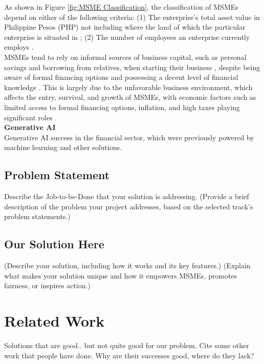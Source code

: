 \documentclass{article}
\begin{document}
As shown in Figure \ref{fig:MSME Classification}, the classification of MSMEs depend on either of the following criteria: (1) The enterprise's total asset value in Philippine Pesos (PHP)  not including where the land of which the particular enterprise is situated in \parencite{republic_of_the_philippines_magna_2008}; (2) The number of employees an enterprise currently employs \parencite{senate_economic_planning_office_msme_2012}.\\

MSMEs tend to rely on informal sources of business capital, such as personal savings and borrowing from relatives, when starting their business \parencite{almeda_micro_2012}, despite being aware of formal financing options and possessing a decent level of financial knowledge \parencite{ibarra_accounting_2015}. This is largely due to the unfavorable business environment, which affects the entry, survival, and growth of MSMEs, with economic factors such as limited access to formal financing options, inflation, and high taxes playing significant roles \parencite{duran_common_2024} \parencite{senate_economic_planning_office_msme_2012}. \\

\textbf{Generative AI} \\
Generative AI success in the financial sector, which were previously powered by machine learning and other solutions.


\subsection{Problem Statement}
Describe the Job-to-be-Done that your solution is addressing.
(Provide a brief description of the problem your project addresses, based on the selected track's problem statements.)


\subsection{Our Solution Here}
(Describe your solution, including how it works and its key features.)
(Explain what makes your solution unique and how it empowers MSMEs, promotes fairness, or inspires action.)

\section{Related Work}
Solutions that are good.. but not quite good for our problem. Cite some other work that people have done. Why are their successes good, where do they lack?
\end{document}
